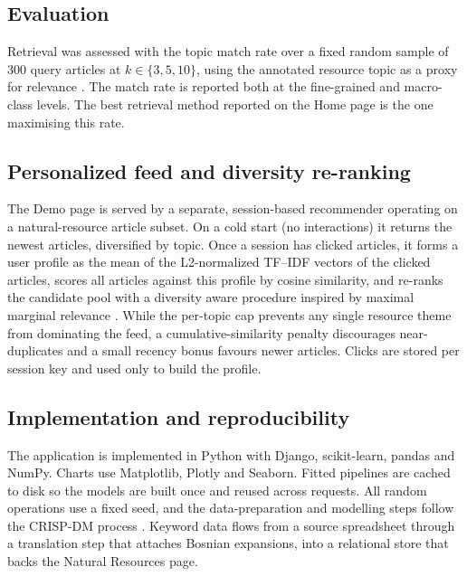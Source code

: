 \documentclass[fleqn,10pt]{wlscirep}
\begin{document}
\subsection*{Evaluation}

Retrieval was assessed with the topic match rate over a fixed random sample of 300 query articles at $k \in \{3,5,10\}$, using the annotated resource topic as a proxy for relevance \cite{lops2011content}. The match rate is reported both at the fine-grained and macro-class levels. The best retrieval method reported on the Home page is the one maximising this rate.

\subsection*{Personalized feed and diversity re-ranking}

The Demo page is served by a separate, session-based recommender operating on a natural-resource article subset. On a cold start (no interactions) it returns the newest articles, diversified by topic. Once a session has clicked articles, it forms a user profile as the mean of the L2-normalized TF--IDF vectors of the clicked articles, scores all articles against this profile by cosine similarity, and re-ranks the candidate pool with a diversity aware procedure inspired by maximal marginal relevance \cite{carbonell1998use}. While the per-topic cap prevents any single resource theme from dominating the feed, a cumulative-similarity penalty discourages near-duplicates and a small recency bonus favours newer articles. Clicks are stored per session key and used only to build the profile.

\subsection*{Implementation and reproducibility}

The application is implemented in Python with Django, scikit-learn, pandas and NumPy. Charts use Matplotlib, Plotly and Seaborn. Fitted pipelines are cached to disk so the models are built once and reused across requests. All random operations use a fixed seed, and the data-preparation and modelling steps follow the CRISP-DM process \cite{wirth2000crisp}. Keyword data flows from a source spreadsheet through a translation step that attaches Bosnian expansions, into a relational store that backs the Natural Resources page.


\end{document}
